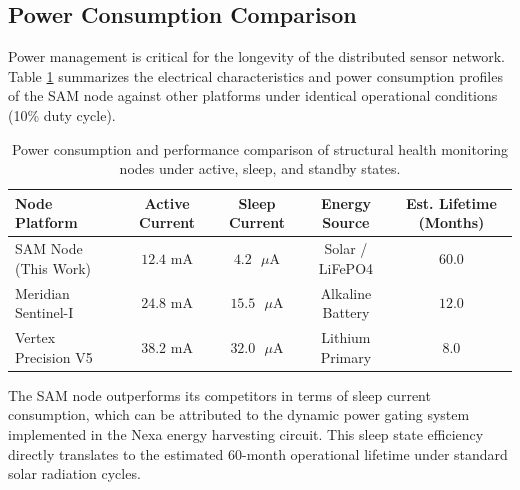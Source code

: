 \subsection{Power Consumption Comparison}
Power management is critical for the longevity of the distributed sensor network. Table \ref{tab:power_perf} summarizes the electrical characteristics and power consumption profiles of the SAM node against other platforms under identical operational conditions (10\% duty cycle).

\begin{table}[htbp]
\caption{Power consumption and performance comparison of structural health monitoring nodes under active, sleep, and standby states.}
\label{tab:power_perf}
\centering
\begin{tabular}{lcccc}
\toprule
\textbf{Node Platform} & \textbf{Active Current} & \textbf{Sleep Current} & \textbf{Energy Source} & \textbf{Est. Lifetime (Months)} \\
\midrule
SAM Node (This Work) & $12.4\text{ mA}$ & $4.2\text{ }\mu\text{A}$ & Solar / LiFePO4 & $60.0$ \\{}
Meridian Sentinel-I \cite{Meridian2023} & $24.8\text{ mA}$ & $15.5\text{ }\mu\text{A}$ & Alkaline Battery & $12.0$ \\{}
Vertex Precision V5 & $38.2\text{ mA}$ & $32.0\text{ }\mu\text{A}$ & Lithium Primary & $8.0$ \\
\bottomrule
\end{tabular}
\end{table}

The SAM node outperforms its competitors in terms of sleep current consumption, which can be attributed to the dynamic power gating system implemented in the Nexa energy harvesting circuit. This sleep state efficiency directly translates to the estimated 60-month operational lifetime under standard solar radiation cycles.
